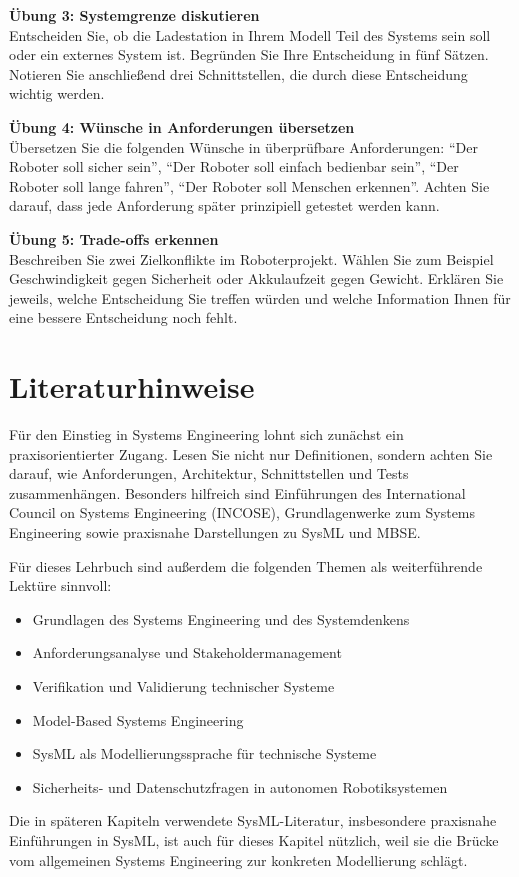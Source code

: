 \begin{uebungbox}
\textbf{Übung 3: Systemgrenze diskutieren}\\
Entscheiden Sie, ob die Ladestation in Ihrem Modell Teil des Systems sein soll oder ein externes System ist. Begründen Sie Ihre Entscheidung in fünf Sätzen. Notieren Sie anschließend drei Schnittstellen, die durch diese Entscheidung wichtig werden.
\end{uebungbox}

\begin{uebungbox}
\textbf{Übung 4: Wünsche in Anforderungen übersetzen}\\
Übersetzen Sie die folgenden Wünsche in überprüfbare Anforderungen: \enquote{Der Roboter soll sicher sein}, \enquote{Der Roboter soll einfach bedienbar sein}, \enquote{Der Roboter soll lange fahren}, \enquote{Der Roboter soll Menschen erkennen}. Achten Sie darauf, dass jede Anforderung später prinzipiell getestet werden kann.
\end{uebungbox}

\begin{uebungbox}
\textbf{Übung 5: Trade-offs erkennen}\\
Beschreiben Sie zwei Zielkonflikte im Roboterprojekt. Wählen Sie zum Beispiel Geschwindigkeit gegen Sicherheit oder Akkulaufzeit gegen Gewicht. Erklären Sie jeweils, welche Entscheidung Sie treffen würden und welche Information Ihnen für eine bessere Entscheidung noch fehlt.
\end{uebungbox}

\section{Literaturhinweise}

Für den Einstieg in Systems Engineering lohnt sich zunächst ein praxisorientierter Zugang. Lesen Sie nicht nur Definitionen, sondern achten Sie darauf, wie Anforderungen, Architektur, Schnittstellen und Tests zusammenhängen. Besonders hilfreich sind Einführungen des International Council on Systems Engineering (INCOSE), Grundlagenwerke zum Systems Engineering sowie praxisnahe Darstellungen zu SysML und MBSE.

Für dieses Lehrbuch sind außerdem die folgenden Themen als weiterführende Lektüre sinnvoll:

\begin{itemize}
    \item Grundlagen des Systems Engineering und des Systemdenkens
    \item Anforderungsanalyse und Stakeholdermanagement
    \item Verifikation und Validierung technischer Systeme
    \item Model-Based Systems Engineering
    \item SysML als Modellierungssprache für technische Systeme
    \item Sicherheits- und Datenschutzfragen in autonomen Robotiksystemen
\end{itemize}

Die in späteren Kapiteln verwendete SysML-Literatur, insbesondere praxisnahe Einführungen in SysML, ist auch für dieses Kapitel nützlich, weil sie die Brücke vom allgemeinen Systems Engineering zur konkreten Modellierung schlägt.
